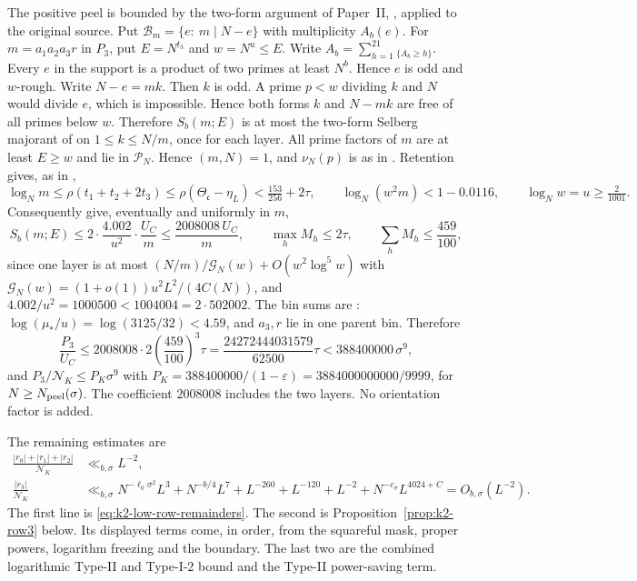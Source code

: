 The positive peel is bounded by the two-form argument of Paper~II,
\cite[(4.46)--(4.56)]{PaperII}, applied to the original source.
Put \(\mathcal B_m=\{e:\ m\mid N-e\}\) with multiplicity \(A_b(e)\).
For \(m=a_1a_2a_3r\) in \(P_3\), put \(E=N^{t_3}\) and \(w=N^u\le E\).
Write \(A_b=\sum_{h=1}^21_{\{A_b\ge h\}}\).
Every \(e\) in the support is a product of two primes at least \(N^b\).
Hence \(e\) is odd and \(w\)-rough. Write \(N-e=mk\). Then \(k\) is odd. A
prime \(p<w\) dividing \(k\) and \(N\) would divide \(e\), which is impossible.
Hence both forms \(k\) and \(N-mk\) are free of all primes below \(w\).
Therefore \(S_b(m;E)\) is at most the two-form Selberg majorant of
\cite[(4.48)--(4.53)]{PaperII} on \(1\le k\le N/m\), once for each layer.
All prime factors of \(m\) are at least \(E\ge w\) and lie in
\(\mathcal P_N\). Hence \((m,N)=1\), and \(\nu_N(p)\) is as in
\cite[(4.48)]{PaperII}. Retention gives, as in \cite[(4.55)]{PaperII},
\begin{equation}\label{eq:k2-peel-ranges}
 \log_Nm\le\rho(t_1+t_2+2t_3)\le\rho(\Theta_{\mathfrak c}-\eta_L)
 <\tfrac{153}{256}+2\tau,\qquad
 \log_N(w^2m)<1-0.0116,\qquad \log_Nw=u\ge\tfrac2{1001}.
\end{equation}
Consequently \cite[(4.47), (4.53), (4.54)]{PaperII} give, eventually and
uniformly in \(m\),
\begin{equation}\label{eq:k2-peel-inputs}
 S_b(m;E)\le2\cdot\frac{4.002}{u^2}\cdot\frac{U_C}{m}
 \le\frac{2008008\,U_C}{m},\qquad
 \max_hM_h\le2\tau,\qquad \sum_hM_h\le\frac{459}{100},
\end{equation}
since one layer is at most \((N/m)/\mathcal G_N(w)+O(w^2\log^5w)\) with
\(\mathcal G_N(w)=(1+o(1))u^2L^2/(4C(N))\), and
\(4.002/u^2=1000500<1004004=2\cdot502002\). The bin sums are
\cite[(4.56)]{PaperII}: \(\log(\mu_*/u)=\log(3125/32)<4.59\), and
\(a_3,r\) lie in one parent bin. Therefore
\begin{equation}\label{eq:k2-peel}
 \frac{P_3}{U_C}\le2008008\cdot2\left(\frac{459}{100}\right)^3\tau
 =\frac{24272444031579}{62500}\tau<388400000\,\sigma^9,
\end{equation}
and \(P_3/\mathcal N_K\le P_K\sigma^9\) with
\(P_K=388400000/(1-\varepsilon)=3884000000000/9999\), for
\(N\ge N_{\rm peel}(\sigma)\). The coefficient \(2008008\) includes the two
layers. No orientation factor is added.

The remaining estimates are
\begin{equation}\label{eq:k2-remainder-estimates}
\begin{aligned}
 \frac{|r_0|+|r_1|+|r_2|}{\mathcal N_K}&\ll_{b,\sigma}L^{-2},\\
 \frac{|r_3|}{\mathcal N_K}&\ll_{b,\sigma}
 N^{-\ell_0\sigma^2}L^3+N^{-b/4}L^7+L^{-260}+L^{-120}
 +L^{-2}+N^{-c_\sigma}L^{4024+C}
 =O_{b,\sigma}(L^{-2}).
\end{aligned}
\end{equation}
The first line is \eqref{eq:k2-low-row-remainders}. The second is
Proposition~\ref{prop:k2-row3} below. Its displayed terms come, in order,
from the squareful mask, proper powers, logarithm freezing and the
boundary. The last two are the combined logarithmic Type-II and Type-I-2
bound and the Type-II power-saving term.


